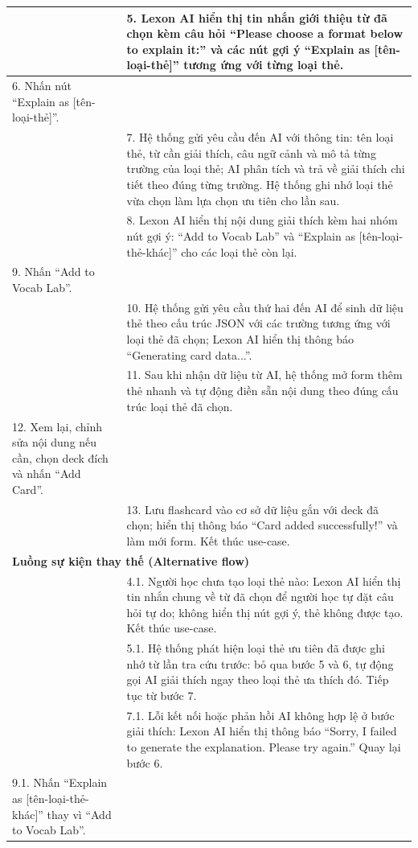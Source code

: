 \begin{longtable}{|p{\tbu}|p{\tbu}|}
    & 5. Lexon AI hiển thị tin nhắn giới thiệu từ đã chọn kèm câu hỏi ``Please choose a format below to explain it:'' và các nút gợi ý ``Explain as [tên-loại-thẻ]'' tương ứng với từng loại thẻ. \\ \hline
    6. Nhấn nút ``Explain as [tên-loại-thẻ]''. & \\ \hline
    & 7. Hệ thống gửi yêu cầu đến AI với thông tin: tên loại thẻ, từ cần giải thích, câu ngữ cảnh và mô tả từng trường của loại thẻ; AI phân tích và trả về giải thích chi tiết theo đúng từng trường. Hệ thống ghi nhớ loại thẻ vừa chọn làm lựa chọn ưu tiên cho lần sau. \\ \hline
    & 8. Lexon AI hiển thị nội dung giải thích kèm hai nhóm nút gợi ý: ``Add to Vocab Lab'' và ``Explain as [tên-loại-thẻ-khác]'' cho các loại thẻ còn lại. \\ \hline
    9. Nhấn ``Add to Vocab Lab''. & \\ \hline
    & 10. Hệ thống gửi yêu cầu thứ hai đến AI để sinh dữ liệu thẻ theo cấu trúc JSON với các trường tương ứng với loại thẻ đã chọn; Lexon AI hiển thị thông báo ``Generating card data...''. \\ \hline
    & 11. Sau khi nhận dữ liệu từ AI, hệ thống mở form thêm thẻ nhanh và tự động điền sẵn nội dung theo đúng cấu trúc loại thẻ đã chọn. \\ \hline
    12. Xem lại, chỉnh sửa nội dung nếu cần, chọn deck đích và nhấn ``Add Card''. & \\ \hline
    & 13. Lưu flashcard vào cơ sở dữ liệu gắn với deck đã chọn; hiển thị thông báo ``Card added successfully!'' và làm mới form. Kết thúc use-case. \\ \hline
    \multicolumn{2}{|l|}{\textbf{Luồng sự kiện thay thế (Alternative flow)}} \\ \hline
    & 4.1. Người học chưa tạo loại thẻ nào: Lexon AI hiển thị tin nhắn chung về từ đã chọn để người học tự đặt câu hỏi tự do; không hiển thị nút gợi ý, thẻ không được tạo. Kết thúc use-case. \\ \hline
    & 5.1. Hệ thống phát hiện loại thẻ ưu tiên đã được ghi nhớ từ lần tra cứu trước: bỏ qua bước 5 và 6, tự động gọi AI giải thích ngay theo loại thẻ ưa thích đó. Tiếp tục từ bước 7. \\ \hline
    & 7.1. Lỗi kết nối hoặc phản hồi AI không hợp lệ ở bước giải thích: Lexon AI hiển thị thông báo ``Sorry, I failed to generate the explanation. Please try again.'' Quay lại bước 6. \\ \hline
    9.1. Nhấn ``Explain as [tên-loại-thẻ-khác]'' thay vì ``Add to Vocab Lab''. & \\ \hline

\end{longtable}
